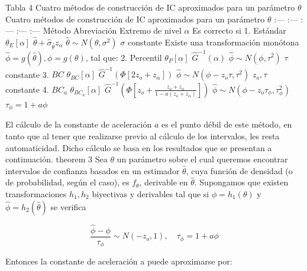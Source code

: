 \documentclass[
]{article}
\begin{document}
Tabla 4
Cuatro métodos de construcción de IC aproximados para un parámetro \(\theta\)
\textbar{} Cuatro métodos de construcción de IC aproximados para un parámetro \(\theta\) \textbar{} \textbar{} \textbar{} \textbar{} \textbar{}
\textbar{} :--- \textbar{} :--- \textbar{} :--- \textbar{} :--- \textbar{} :--- \textbar{}
\textbar{} Método \textbar{} Abreviación \textbar{} Extremo de nivel \(\alpha\) \textbar{} Es correcto si \textbar{} \textbar{}
\textbar{} 1. Estándar \textbar{} \(\theta_{E}[\alpha]\) \textbar{} \(\hat{\theta}+\hat{\sigma}_{\hat{\theta}} z_{\alpha}\) \textbar{} \(\hat{\theta} \sim N\left(\theta, \sigma^{2}\right)\) \textbar{} \(\sigma\) constante \textbar{}
\textbar{} \textbar{} \textbar{} \textbar{} Existe una transformación monótona \(\hat{\phi}=g(\hat{\theta}), \phi=g(\theta)\), tal que: \textbar{} \textbar{}
\textbar{} 2. Percentil \textbar{} \(\theta_{P}[\alpha]\) \textbar{} \(\hat{G}^{-1}(\alpha)\) \textbar{} \(\hat{\phi} \sim N\left(\phi, \tau^{2}\right)\) \textbar{} \(\tau\) constante \textbar{}
\textbar{} 3. \(B C\) \textbar{} \(\theta_{B C}[\alpha]\) \textbar{} \(\hat{G}^{-1}\left(\Phi\left[2 z_{o}+z_{\alpha}\right]\right)\) \textbar{} \(\hat{\phi} \sim N\left(\phi-z_{o} \tau, \tau^{2}\right)\) \textbar{} \(z_{o}, \tau\) constante \textbar{}
\textbar{} 4. \(B C_{a}\) \textbar{} \(\theta_{B C_{a}}[\alpha]\) \textbar{} \(\hat{G}^{-1}\left(\Phi\left[z_{o}+\frac{z_{o}+z_{\alpha}}{1-a\left(z_{o}+z_{\alpha}\right)}\right]\right)\) \textbar{} \(\hat{\phi} \sim N\left(\phi-z_{o} \tau_{\phi}, \tau_{\phi}^{2}\right)\) \textbar{} \(\tau_{\phi}=1+a \phi\) \textbar{}
\textbar{} \textbar{} \textbar{} \textbar{} \textbar{} \textbar{}

El cálculo de la constante de aceleración \(a\) es el punto débil de este método, en tanto que al tener que realizarse previo al cálculo de los intervalos, les resta automaticidad. Dicho cálculo se basa en los resultados que se presentan a continuación.
theorem 3 Sea \(\theta\) un parámetro sobre el cual queremos encontrar intervalos de confianza basados en un estimador \(\hat{\theta}\), cuya función de densidad (o de
probabilidad, según el caso), es \(f_{\theta}\), derivable en \(\hat{\theta}\). Supongamos que existen transformaciones \(h_{1}, h_{2}\) biyectivas y derivables tal que si \(\phi=h_{1}(\theta)\) y \(\hat{\phi}=h_{2}(\hat{\theta})\) se verifica

\[
\frac{\hat{\phi}-\phi}{\tau_{\phi}} \sim N\left(-z_{o}, 1\right), \quad \tau_{\phi}=1+a \phi
\]

Entonces la constante de aceleración a puede aproximarse por:
\end{document}
